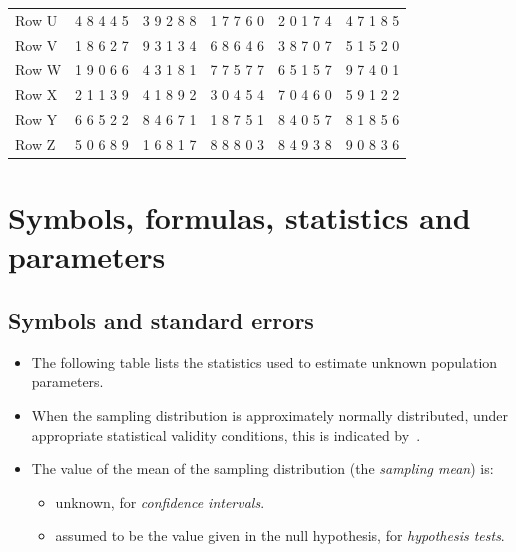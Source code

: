 \documentclass[
  11pt,
  a4paper,
  krantz2]{krantz}
\providecommand{\tightlist}{%
  \setlength{\itemsep}{0pt}\setlength{\parskip}{0pt}}
\begin{document}
\begin{table}
\begin{tabular}[t]{llllll}
\addlinespace
Row U & 4 8 4 4 5 & 3 9 2 8 8 & 1 7 7 6 0 & 2 0 1 7 4 & 4 7 1 8 5\\
Row V & 1 8 6 2 7 & 9 3 1 3 4 & 6 8 6 4 6 & 3 8 7 0 7 & 5 1 5 2 0\\
Row W & 1 9 0 6 6 & 4 3 1 8 1 & 7 7 5 7 7 & 6 5 1 5 7 & 9 7 4 0 1\\
Row X & 2 1 1 3 9 & 4 1 8 9 2 & 3 0 4 5 4 & 7 0 4 6 0 & 5 9 1 2 2\\
Row Y & 6 6 5 2 2 & 8 4 6 7 1 & 1 8 7 5 1 & 8 4 0 5 7 & 8 1 8 5 6\\
\addlinespace
Row Z & 5 0 6 8 9 & 1 6 8 1 7 & 8 8 8 0 3 & 8 4 9 3 8 & 9 0 8 3 6\\
\bottomrule
\end{tabular}
\end{table}

\chapter{Symbols, formulas, statistics and parameters}\label{StatisticsAndParameters}

\section{Symbols and standard errors}\label{Symbols}

\begin{itemize}
\item
  The following table lists the statistics used to estimate unknown population parameters. \tightlist
\item
  When the sampling distribution is approximately normally distributed, under appropriate statistical validity conditions, this is indicated by~.
\item
  The value of the mean of the sampling distribution (the \emph{sampling mean}) is:

  \begin{itemize}
  \tightlist
  \item
    unknown, for \emph{confidence intervals}.
  \item
    assumed to be the value given in the null hypothesis, for \emph{hypothesis tests}.
  \end{itemize}
\end{itemize}
\end{document}
